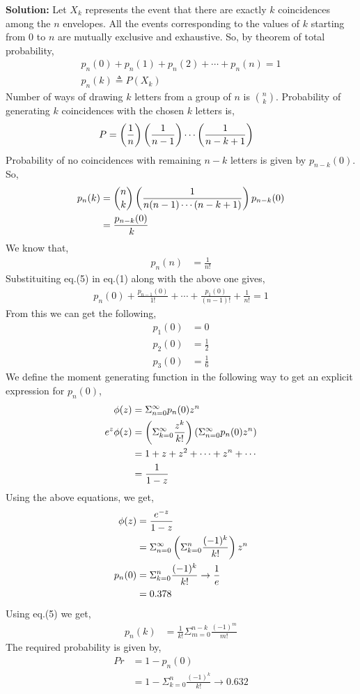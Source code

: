\documentclass[journal,12pt,twocolumn]{IEEEtran}
\begin{document}
	\textbf{Solution:}
	Let $X_k$ represents the event that there are exactly $k$ coincidences among the $n$ envelopes. All the events corresponding to the values of $k$ starting from 0 to $n$ are mutually exclusive and exhaustive. So, by theorem of total probability,
	\begin{align}
	       & p_n(0)+p_n(1)+p_n(2)+\cdots+p_n(n) = 1 &\\
	       & p_n(k) \triangleq P(X_k) &
	\end{align}
	Number of ways of drawing $k$ letters from a group of $n$ is ${n \choose k}$.
	Probability of generating $k$ coincidences with the chosen $k$ letters is,
	\begin{align}
	        P &= \left(\frac{1}{n}\right)\left(\frac{1}{n-1}\right)\cdots\left(\frac{1}{n-k+1}\right) 
	\end{align}
	Probability of no coincidences with remaining $n-k$ letters is given by $p_{n-k}(0)$.
	So,
	\begin{align}
	 p_n(k) &= {n \choose k}\left(\frac{1}{n(n-1)\cdots(n-k+1)}\right)p_{n-k}(0) \\
	 &= \frac{p_{n-k}(0)}{k\!}
	\end{align}
	We know that,
	\begin{align}
	           p_n(n) &= \frac{1}{n!}
	\end{align}
	Substituiting eq.(5) in eq.(1) along with the above one gives,
	\begin{align}
	 & p_n(0)+\frac{p_{n-1}(0)}{1!}+\cdots+\frac{p_{1}(0)}{(n-1)!}+\frac{1}{n!} = 1 &
	\end{align}
	From this we can get the following,
	\begin{align}
	          p_1(0) &= 0 \\
	          p_2(0) &= \frac{1}{2} \\
	          p_3(0) &= \frac{1}{6}
	\end{align}
	We define the moment generating function in the following way to get an explicit expression for $p_n(0)$,
	\begin{align}
	         \phi(z) &= \Sigma^\infty_{n=0}p_n(0)z^n \\
	         e^z\phi(z) &= \left(\Sigma^\infty_{k=0}\frac{z^k}{k!}\right)\left(\Sigma^\infty_{n=0}p_n(0)z^n\right) \\
	         &= 1+z+z^2+\cdots+z^n+\cdots \\
	         &= \frac{1}{1-z}
	\end{align}
	Using the above equations, we get,
	\begin{align}
	\phi(z) &= \frac{e^{-z}}{1-z} \\
	        &= \Sigma^\infty_{n=0}\left(\Sigma^n_{k=0}\frac{(-1)^k}{k!}\right)z^n \\
	p_n(0) &= \Sigma^n_{k=0}\frac{(-1)^k}{k!} \rightarrow \frac{1}{e} \\
	       &= 0.378
	\end{align} 
	Using eq.(5) we get,
	\begin{align}
	         p_n(k) &= \frac{1}{k!}\Sigma^{n-k}_{m=0}\frac{(-1)^m}{m!}
	\end{align}
	The required probability is given by,
	\begin{align}
	   Pr &= 1-p_n(0) \\
	   &= 1-\Sigma^n_{k=0}\frac{(-1)^k}{k!} \rightarrow 0.632	
	\end{align}      
	           
\end{document}
